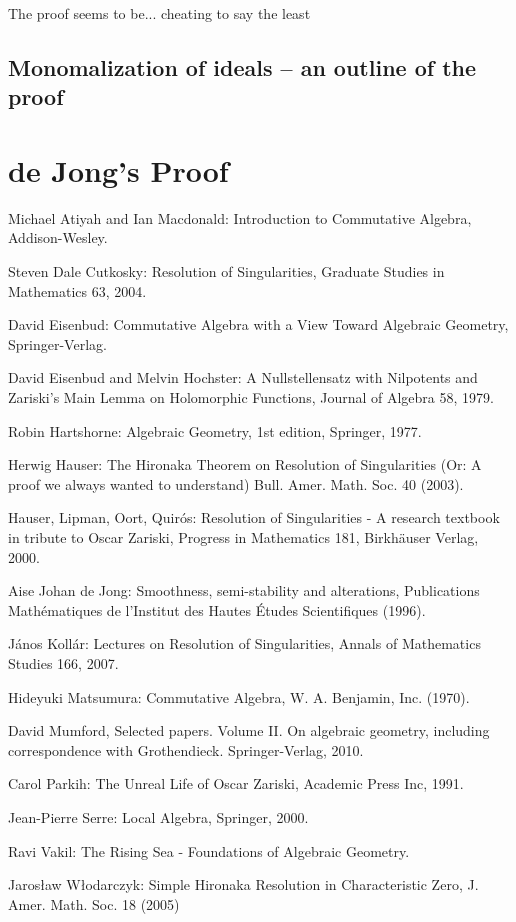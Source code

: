 \documentclass[12pt,a4paper,leqno]{article}
\theoremstyle{plain}
\theoremstyle{definition}
\theoremstyle{remark}
\begin{document}
The proof seems to be... cheating to say the least
 
\subsection{Monomalization of ideals -- an outline of the proof}

\section{de Jong's Proof}\label{deJongRes}

\begin{thebibliography}{5, style=alpha}

Michael Atiyah and Ian Macdonald: Introduction to Commutative Algebra, Addison-Wesley.

Steven Dale Cutkosky: Resolution of Singularities, Graduate Studies in Mathematics 63, 2004.

David Eisenbud: Commutative Algebra with a View Toward Algebraic Geometry, Springer-Verlag.

David Eisenbud and Melvin Hochster: A Nullstellensatz with Nilpotents and Zariski's Main Lemma on Holomorphic Functions, Journal of Algebra 58, 1979.

Robin Hartshorne: Algebraic Geometry, 1st edition, Springer, 1977.

Herwig Hauser: The Hironaka Theorem on Resolution of Singularities (Or: A proof we always wanted to understand) Bull. Amer. Math. Soc. 40 (2003).

Hauser, Lipman, Oort, Quirós: Resolution of Singularities - A research textbook in tribute to Oscar Zariski, Progress in Mathematics 181, Birkhäuser Verlag, 2000.

Aise Johan de Jong: Smoothness, semi-stability and alterations, Publications Mathématiques de l’Institut des Hautes Études Scientifiques (1996).

János Kollár: Lectures on Resolution of Singularities, Annals of Mathematics Studies 166, 2007.

Hideyuki Matsumura: Commutative Algebra, W. A. Benjamin, Inc. (1970).

David Mumford, Selected papers. Volume II. On algebraic geometry, including correspondence with Grothendieck. Springer-Verlag, 2010.

 Carol Parkih: The Unreal Life of Oscar Zariski, Academic Press Inc, 1991.

Jean-Pierre Serre: Local Algebra, Springer, 2000.

Ravi Vakil: The Rising Sea - Foundations of Algebraic Geometry.

Jaros\l{}aw W\l{}odarczyk: Simple Hironaka Resolution in Characteristic Zero, J. Amer. Math. Soc. 18 (2005)
\end{thebibliography}
\end{document}
